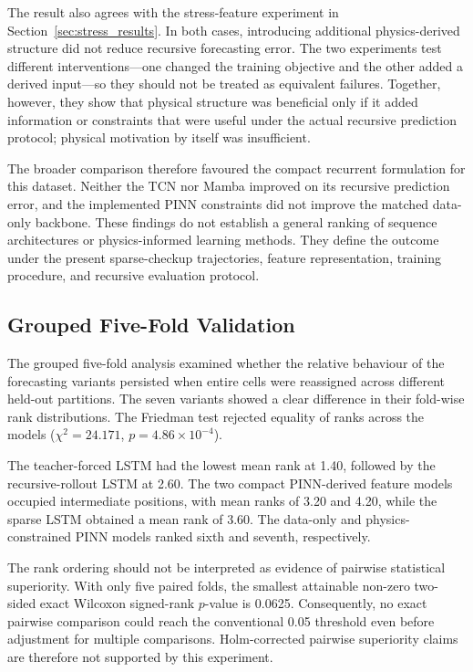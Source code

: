 \documentclass[a4paper,fleqn]{cas-sc}
\begin{document}
The result also agrees with the stress-feature experiment in Section~\ref{sec:stress_results}. In both cases, introducing additional physics-derived structure did not reduce recursive forecasting error. The two experiments test different interventions---one changed the training objective and the other added a derived input---so they should not be treated as equivalent failures. Together, however, they show that physical structure was beneficial only if it added information or constraints that were useful under the actual recursive prediction protocol; physical motivation by itself was insufficient.

The broader comparison therefore favoured the compact recurrent formulation for this dataset. Neither the TCN nor Mamba improved on its recursive prediction error, and the implemented PINN constraints did not improve the matched data-only backbone. These findings do not establish a general ranking of sequence architectures or physics-informed learning methods. They define the outcome under the present sparse-checkup trajectories, feature representation, training procedure, and recursive evaluation protocol.


\subsection{Grouped Five-Fold Validation}
\label{sec:grouped_cv_results}

The grouped five-fold analysis examined whether the relative behaviour of the forecasting variants persisted when entire cells were reassigned across different held-out partitions. The seven variants showed a clear difference in their fold-wise rank distributions. The Friedman test rejected equality of ranks across the models
($\chi^{2}=24.171$, $p=4.86\times10^{-4}$).


The teacher-forced LSTM had the lowest mean rank at 1.40, followed by the recursive-rollout LSTM at 2.60. The two compact PINN-derived feature models occupied intermediate positions, with mean ranks of 3.20 and 4.20, while the sparse LSTM obtained a mean rank of 3.60. The data-only and physics-constrained PINN models ranked sixth and seventh, respectively.

The rank ordering should not be interpreted as evidence of pairwise statistical superiority. With only five paired folds, the smallest attainable non-zero two-sided exact Wilcoxon signed-rank $p$-value is 0.0625. Consequently, no exact pairwise comparison could reach the conventional 0.05 threshold even before adjustment for multiple comparisons. Holm-corrected pairwise superiority claims are therefore not supported by this experiment.
\end{document}
